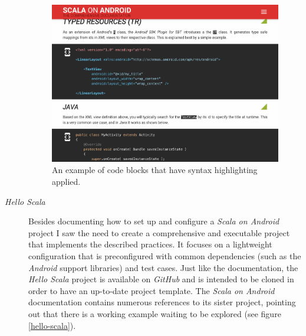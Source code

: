 \begin{description}
	\begin{figure}[]
		\includegraphics[width=\textwidth]{asset/syntax-highlighting.png}
		\caption{An example of code blocks that have syntax highlighting applied.}
		\label{syntax-highlighting}
	\end{figure}

	\item[\textit{Hello Scala}]\hfill

	Besides documenting how to set up and configure a \textit{Scala on Android} project I saw the need to create a comprehensive and executable project that implements the described practices. It focuses on a lightweight configuration that is preconfigured with common dependencies (such as the \textit{Android} support libraries) and test cases. Just like the documentation, the \textit{Hello Scala} project is available on \textit{GitHub} and is intended to be cloned in order to have an up-to-date project template. The \textit{Scala on Android} documentation contains numerous references to its sister project, pointing out that there is a working example waiting to be explored (see figure \ref{hello-scala}).


\end{description}
